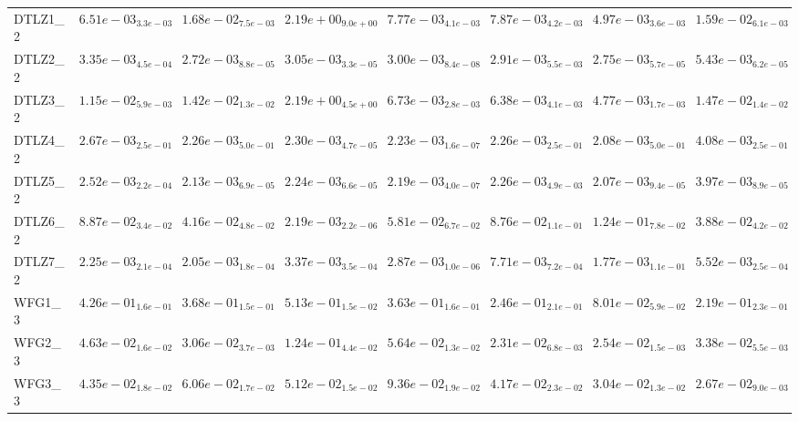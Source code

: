 \documentclass{article}
\begin{document}
\begin{landscape}
\begin{table}
\begin{scriptsize}
\begin{tabular}{llllllll}
DTLZ1\_2 & \cellcolor{gray25}$  6.51e-03_{ 3.3e-03}$ & $  1.68e-02_{ 7.5e-03}$ & $  2.19e+00_{ 9.0e+00}$ & $  7.77e-03_{ 4.1e-03}$ & $  7.87e-03_{ 4.2e-03}$ & \cellcolor{gray95}$  4.97e-03_{ 3.6e-03}$ & $  1.59e-02_{ 6.1e-03}$ \\
DTLZ2\_2 & $  3.35e-03_{ 4.5e-04}$ & \cellcolor{gray95}$  2.72e-03_{ 8.8e-05}$ & $  3.05e-03_{ 3.3e-05}$ & $  3.00e-03_{ 8.4e-08}$ & $  2.91e-03_{ 5.5e-03}$ & \cellcolor{gray25}$  2.75e-03_{ 5.7e-05}$ & $  5.43e-03_{ 6.2e-05}$ \\
DTLZ3\_2 & $  1.15e-02_{ 5.9e-03}$ & $  1.42e-02_{ 1.3e-02}$ & $  2.19e+00_{ 4.5e+00}$ & $  6.73e-03_{ 2.8e-03}$ & \cellcolor{gray25}$  6.38e-03_{ 4.1e-03}$ & \cellcolor{gray95}$  4.77e-03_{ 1.7e-03}$ & $  1.47e-02_{ 1.4e-02}$ \\
DTLZ4\_2 & $  2.67e-03_{ 2.5e-01}$ & $  2.26e-03_{ 5.0e-01}$ & $  2.30e-03_{ 4.7e-05}$ & \cellcolor{gray25}$  2.23e-03_{ 1.6e-07}$ & $  2.26e-03_{ 2.5e-01}$ & \cellcolor{gray95}$  2.08e-03_{ 5.0e-01}$ & $  4.08e-03_{ 2.5e-01}$ \\
DTLZ5\_2 & $  2.52e-03_{ 2.2e-04}$ & \cellcolor{gray25}$  2.13e-03_{ 6.9e-05}$ & $  2.24e-03_{ 6.6e-05}$ & $  2.19e-03_{ 4.0e-07}$ & $  2.26e-03_{ 4.9e-03}$ & \cellcolor{gray95}$  2.07e-03_{ 9.4e-05}$ & $  3.97e-03_{ 8.9e-05}$ \\
DTLZ6\_2 & $  8.87e-02_{ 3.4e-02}$ & $  4.16e-02_{ 4.8e-02}$ & \cellcolor{gray95}$  2.19e-03_{ 2.2e-06}$ & $  5.81e-02_{ 6.7e-02}$ & $  8.76e-02_{ 1.1e-01}$ & $  1.24e-01_{ 7.8e-02}$ & \cellcolor{gray25}$  3.88e-02_{ 4.2e-02}$ \\
DTLZ7\_2 & $  2.25e-03_{ 2.1e-04}$ & \cellcolor{gray25}$  2.05e-03_{ 1.8e-04}$ & $  3.37e-03_{ 3.5e-04}$ & $  2.87e-03_{ 1.0e-06}$ & $  7.71e-03_{ 7.2e-04}$ & \cellcolor{gray95}$  1.77e-03_{ 1.1e-01}$ & $  5.52e-03_{ 2.5e-04}$ \\
WFG1\_3 & $  4.26e-01_{ 1.6e-01}$ & $  3.68e-01_{ 1.5e-01}$ & $  5.13e-01_{ 1.5e-02}$ & $  3.63e-01_{ 1.6e-01}$ & $  2.46e-01_{ 2.1e-01}$ & \cellcolor{gray95}$  8.01e-02_{ 5.9e-02}$ & \cellcolor{gray25}$  2.19e-01_{ 2.3e-01}$ \\
WFG2\_3 & $  4.63e-02_{ 1.6e-02}$ & $  3.06e-02_{ 3.7e-03}$ & $  1.24e-01_{ 4.4e-02}$ & $  5.64e-02_{ 1.3e-02}$ & \cellcolor{gray95}$  2.31e-02_{ 6.8e-03}$ & \cellcolor{gray25}$  2.54e-02_{ 1.5e-03}$ & $  3.38e-02_{ 5.5e-03}$ \\
WFG3\_3 & $  4.35e-02_{ 1.8e-02}$ & $  6.06e-02_{ 1.7e-02}$ & $  5.12e-02_{ 1.5e-02}$ & $  9.36e-02_{ 1.9e-02}$ & $  4.17e-02_{ 2.3e-02}$ & \cellcolor{gray25}$  3.04e-02_{ 1.3e-02}$ & \cellcolor{gray95}$  2.67e-02_{ 9.0e-03}$ \\

\end{tabular}
\end{scriptsize}
\end{table}
\end{landscape}
\end{document}
